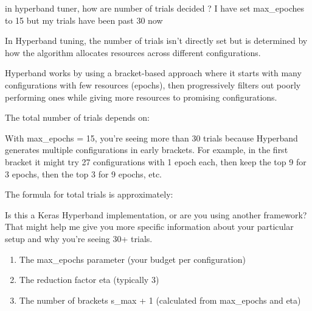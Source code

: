 \begin{userprompt}
in hyperband tuner, how are number of trials decided ? I have set max\_epoches to 15 but my trials have been past 30 now
\end{userprompt}

\begin{botresponse}
In Hyperband tuning, the number of trials isn't directly set but is determined by how the algorithm allocates resources across different configurations.

Hyperband works by using a bracket-based approach where it starts with many configurations with few resources (epochs), then progressively filters out poorly performing ones while giving more resources to promising configurations.

The total number of trials depends on:

With max\_epochs = 15, you're seeing more than 30 trials because Hyperband generates multiple configurations in early brackets. For example, in the first bracket it might try 27 configurations with 1 epoch each, then keep the top 9 for 3 epochs, then the top 3 for 9 epochs, etc.

The formula for total trials is approximately:


Is this a Keras Hyperband implementation, or are you using another framework? That might help me give you more specific information about your particular setup and why you're seeing 30+ trials.

\begin{enumerate}
\item The max\_epochs parameter (your budget per configuration)
\item The reduction factor eta (typically 3)
\item The number of brackets s\_max + 1 (calculated from max\_epochs and eta)
\end{enumerate}
\end{botresponse}

